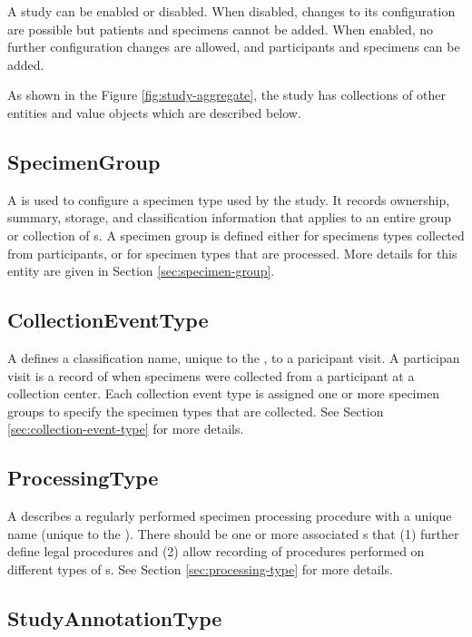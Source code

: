 A study can be enabled or disabled. When disabled, changes to its configuration
are possible but patients and specimens cannot be added. When enabled, no
further configuration changes are allowed, and participants and specimens can
be added.

As shown in the Figure \ref{fig:study-aggregate}, the study has collections of
other entities and value objects which are described below.

\subsection*{SpecimenGroup}

A  is used to configure a specimen type used by the
study.  It records ownership, summary, storage, and classification information
that applies to an entire group or collection of s. A
specimen group is defined either for specimens types collected from
participants, or for specimen types that are processed. More details for this
entity are given in Section \ref{sec:specimen-group}.

\subsection*{CollectionEventType}
A  defines a classification name, unique to
the , to a paricipant visit. A participan visit is a record
of when specimens were collected from a participant at a collection
center. Each collection event type is assigned one or more specimen groups to
specify the specimen types that are collected. See Section
\ref{sec:collection-event-type} for more details.

\subsection*{ProcessingType}
A  describes a regularly performed specimen
processing procedure with a unique name (unique to the
). There should be one or more associated
s that (1) further define legal procedures and (2)
allow recording of procedures performed on different types of
s. See Section \ref{sec:processing-type} for more details.

\subsection*{StudyAnnotationType}

